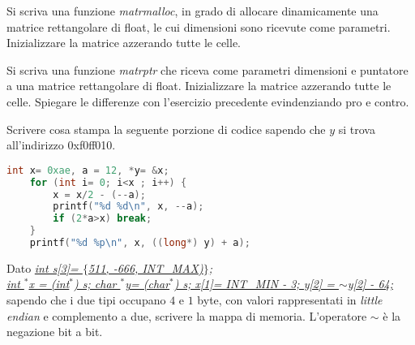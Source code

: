 \documentclass[addpoints,11pt]{exam}
\begin{document}
\begin{questions}
\question[2] Si scriva una funzione \emph{matrmalloc}, in grado di allocare dinamicamente una matrice rettangolare di float, le cui dimensioni sono ricevute come parametri. Inizializzare la matrice azzerando tutte le celle.
\makeemptybox{100pt}



\question[4] Si scriva una funzione \emph{matrptr} che riceva come parametri dimensioni e puntatore a una matrice rettangolare di float. Inizializzare la matrice azzerando tutte le celle. Spiegare le differenze con l'esercizio precedente evindenziando pro e contro.
\makeemptybox{125pt}



\question[4]
Scrivere cosa stampa la seguente porzione di codice sapendo che $y$ si trova all'indirizzo 0xf0ff010.

\begin{minipage}[t]{0.5\linewidth}
\begin{lstlisting}[language=C]
	int x= 0xae, a = 12, *y= &x;
	for (int i= 0; i<x ; i++) {
		x = x/2 - (--a);
		printf("%d %d\n", x, --a);
		if (2*a>x) break;
	}
	printf("%d %p\n", x, ((long*) y) + a);
\end{lstlisting}
\end{minipage}
\begin{minipage}[t]{0.5\linewidth}
	\makeemptybox{100pt}
\end{minipage}



\question[4]
Dato \underline{\emph{int s[3]= $\{$511, -666, INT\_MAX)$\}$;}}\\
\underline{\emph{int  $^*$x = (int$^*$) s;
		char $^*$y= (char$^*$) s;
		x[1]= INT\_MIN - 3; y[2] = $\sim$y[2] - 64;}}  
sapendo che i due tipi occupano $4$ e $1$ byte, con valori rappresentati in \emph{little endian} e complemento a due, scrivere la mappa di memoria. L'operatore $\sim$ è la negazione bit a bit.
\end{questions}
\end{document}
